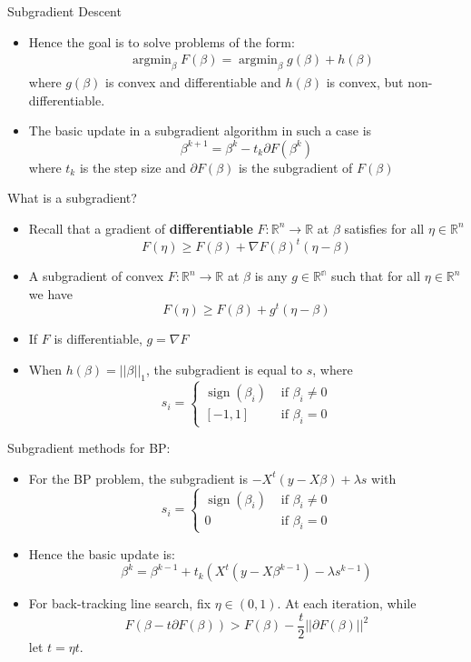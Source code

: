 \documentclass[xcolor=dvipsnames,aspectratio=1610]{beamer}
\newcommand{\norm}[1]{\left|\left|#1\right|\right|}
\DeclareMathOperator*{\sign}{sign}
\DeclareMathOperator*{\argmin}{argmin}
\theoremstyle{remark}
\begin{document}
\begin{frame}{Subgradient Descent}
  \begin{itemize}
    \setlength{\itemsep}{10pt}
  \item Hence the goal is to solve problems of the form:
\begin{align*}
\label{eq:lasso}
& \argmin_{\beta} F(\beta) =  \argmin_{\beta} g(\beta) + h(\beta)
\end{align*}
where $g(\beta)$ is convex and differentiable and $h(\beta)$ is convex, but non-differentiable. 
\item The basic update in a  subgradient algorithm in such a case is
$$
\beta^{k+1} = \beta^{k} - t_k \partial F(\beta^{k})
$$
where $t_{k}$ is the step size and $\partial F(\beta)$ is the subgradient of $F(\beta)$
  \end{itemize}
\end{frame}

\begin{frame}{What is a subgradient?}
  \begin{itemize}
    \setlength{\itemsep}{10pt}
  \item Recall that a gradient of {\bf differentiable} $F:\mathbb{R}^n \to \mathbb{R}$ at $\beta$ satisfies for all $\eta \in \mathbb{R}^n$ 
$$
F(\eta) \geq F(\beta) + \nabla F(\beta) ^t(\eta - \beta)
$$
  \item A subgradient of convex $F:\mathbb{R}^n \to \mathbb{R}$ at $\beta$ is any $g \in \mathbb{R^n}$ such that for all $\eta \in \mathbb{R}^n$ we have
$$
F(\eta) \geq F(\beta) + g^t(\eta - \beta)
$$
\item If $F$ is differentiable, $g = \nabla F$
\item When $h(\beta) = \norm{\beta}_1$, the subgradient is equal to $s$, where
$$
s_i = \begin{cases}
\sign(\beta_i) &\text{ if } \beta_i \neq 0\\
[-1,1] &\text{ if } \beta_i = 0
\end{cases}
$$
  \end{itemize}
\end{frame}

\begin{frame}{Subgradient methods for BP:}
  \begin{itemize}
    \setlength{\itemsep}{10pt}
  \item For the BP problem, the subgradient is $-X^t(y-X\beta) + \lambda s$ with
$$
s_i = \begin{cases}
\sign(\beta_i) &\text{ if } \beta_i \neq 0\\
0 &\text{ if } \beta_i = 0
\end{cases}
$$
\item Hence the basic update is:
$$\beta^k = \beta^{k-1} + t_k (X^t(y-X \beta^{k-1}) - \lambda s^{k-1})$$
\item For back-tracking line search, fix $\eta \in (0,1)$. At each iteration, while 
$$
F(\beta - t \partial F(\beta)) > F(\beta) - \frac{t}{2} \norm{\partial F(\beta)}^2
$$
let $t = \eta t$.
  \end{itemize}
\end{frame}
\end{document}
